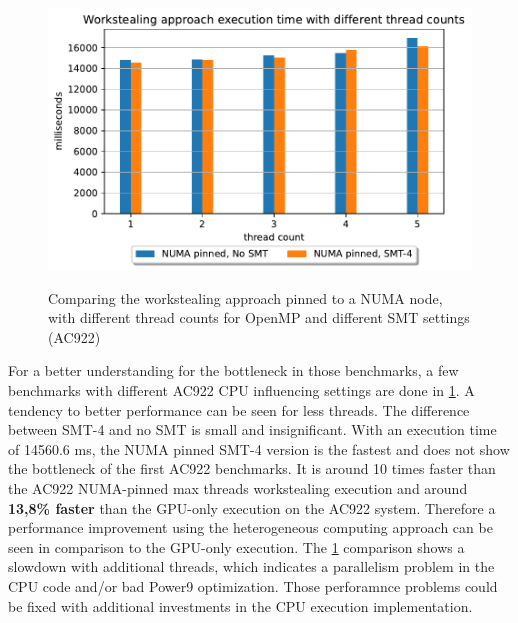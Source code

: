 \begin{figure}[H]
  \caption{Comparing the workstealing approach pinned to a NUMA node, with different thread counts for OpenMP and different SMT settings (AC922)}
  \includegraphics[width=\textwidth]{figures/ac922_threadcount.pdf}
  \centering
  \label{fig:threadcount_ac922}
\end{figure}

For a better understanding for the bottleneck in those benchmarks, a few benchmarks with different AC922 CPU influencing settings are done in \ref{fig:threadcount_ac922}. A tendency to better performance can be seen for less threads. The difference between SMT-4 and no SMT is small and insignificant. With an execution time of 14560.6 ms, the NUMA pinned SMT-4 version is the fastest and does not show the bottleneck of the first AC922 benchmarks. It is around 10 times faster than the AC922 NUMA-pinned max threads workstealing execution and around \textbf{13,8\% faster} than the GPU-only execution on the AC922 system. Therefore a performance improvement using the heterogeneous computing approach can be seen in comparison to the GPU-only execution. The \ref{fig:threadcount_ac922} comparison shows a slowdown with additional threads, which indicates a parallelism problem in the CPU code and/or bad Power9 optimization. Those perforamnce problems could be fixed with additional investments in the CPU execution implementation.


